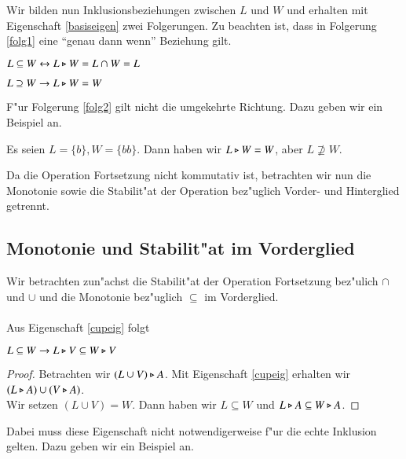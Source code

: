 Wir bilden nun Inklusionsbeziehungen zwischen $L$ und $W$ und erhalten mit Eigenschaft \ref{basiseigen} zwei Folgerungen.
Zu beachten ist, dass in Folgerung \ref{folg1} eine "`genau dann wenn"' Beziehung gilt.

\vspace{2ex}

\begin{folg}\label{folg1}
$L\subseteq W \leftrightarrow L\triangleright W = L\cap W = L$
\end{folg}

\vspace{2ex}

\begin{folg}\label{folg2}
$L\supseteq W \to L\triangleright W = W$
\end{folg}
F"ur Folgerung \ref{folg2} gilt nicht die umgekehrte Richtung. Dazu geben wir ein Beispiel an.

\vspace{2ex}

\begin{beispiel}
Es seien $L=\{b\}, W=\{bb\}$. Dann haben wir $L\triangleright W = W$, aber $L\not\supseteq W$.
\end{beispiel}

Da die Operation Fortsetzung nicht kommutativ ist, betrachten wir nun die Monotonie sowie die Stabilit"at der Operation bez"uglich Vorder- und Hinterglied getrennt.
\subsection{Monotonie und Stabilit"at im Vorderglied}

Wir betrachten zun"achst die Stabilit"at der Operation Fortsetzung bez"ulich $\cap$ und $\cup$ und die Monotonie bez"uglich $\subseteq$ im Vorderglied.\\\\
Aus Eigenschaft \ref{cupeig} folgt

\vspace{2ex}

\begin{eigen}\label{fresh}
$L\subseteq W \to L\triangleright V \subseteq W \triangleright V$
\end{eigen}
\begin{proof}
Betrachten wir $(L\cup V) \triangleright A$. Mit Eigenschaft \ref{cupeig} erhalten wir $(L\triangleright A) \cup (V\triangleright A)$.\\Wir setzen $(L\cup V) = W$.
Dann haben wir $L\subseteq W$ und $L\triangleright A \subseteq W\triangleright A$.
\end{proof}
Dabei muss diese Eigenschaft nicht notwendigerweise f"ur die echte Inklusion gelten. Dazu geben wir ein Beispiel an.

